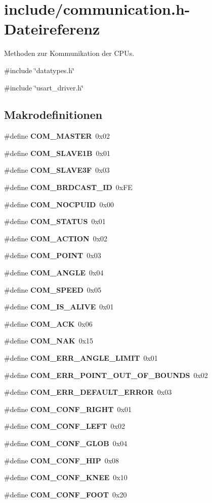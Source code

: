 \section{include/communication.h-\/Dateireferenz}
\label{communication_8h}


Methoden zur Kommunikation der CPUs.  


{\ttfamily \#include \char`\"{}datatypes.h\char`\"{}}\par
{\ttfamily \#include \char`\"{}usart\_\-driver.h\char`\"{}}\par
\subsection*{Makrodefinitionen}
\begin{DoxyCompactItemize}
\item 
\#define {\bf COM\_\-MASTER}~0x02
\item 
\#define {\bf COM\_\-SLAVE1B}~0x01
\item 
\#define {\bf COM\_\-SLAVE3F}~0x03
\item 
\#define {\bf COM\_\-BRDCAST\_\-ID}~0xFE
\item 
\#define {\bf COM\_\-NOCPUID}~0x00
\item 
\#define {\bf COM\_\-STATUS}~0x01
\item 
\#define {\bf COM\_\-ACTION}~0x02
\item 
\#define {\bf COM\_\-POINT}~0x03
\item 
\#define {\bf COM\_\-ANGLE}~0x04
\item 
\#define {\bf COM\_\-SPEED}~0x05
\item 
\#define {\bf COM\_\-IS\_\-ALIVE}~0x01
\item 
\#define {\bf COM\_\-ACK}~0x06
\item 
\#define {\bf COM\_\-NAK}~0x15
\item 
\#define {\bf COM\_\-ERR\_\-ANGLE\_\-LIMIT}~0x01
\item 
\#define {\bf COM\_\-ERR\_\-POINT\_\-OUT\_\-OF\_\-BOUNDS}~0x02
\item 
\#define {\bf COM\_\-ERR\_\-DEFAULT\_\-ERROR}~0x03
\item 
\#define {\bf COM\_\-CONF\_\-RIGHT}~0x01
\item 
\#define {\bf COM\_\-CONF\_\-LEFT}~0x02
\item 
\#define {\bf COM\_\-CONF\_\-GLOB}~0x04
\item 
\#define {\bf COM\_\-CONF\_\-HIP}~0x08
\item 
\#define {\bf COM\_\-CONF\_\-KNEE}~0x10
\item 
\#define {\bf COM\_\-CONF\_\-FOOT}~0x20
\end{DoxyCompactItemize}
